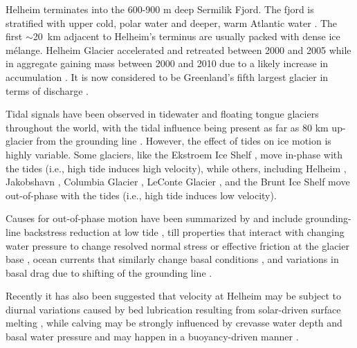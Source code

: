 \documentclass[review]{igs}
\begin{document}
	
Helheim terminates into the 600-900 m deep Sermilik Fjord. The fjord is stratified with upper cold, polar water and deeper, warm Atlantic water \citep{andresen2012rapid,straneo2012characteristics,straneo2013challenges}. The first $\sim$20~km adjacent to Helheim's terminus are usually packed with dense ice m\'elange. Helheim Glacier accelerated and retreated between 2000 and 2005 \citep{howat2005rapid,rignot2006changes} while in aggregate gaining mass between 2000 and 2010 due to a likely increase in accumulation \citep{howat2011mass}. It is now considered to be  Greenland's fifth largest glacier in terms of discharge \citep{enderlin2014improved}.
	
	
Tidal signals have been observed in tidewater and floating tongue glaciers throughout the world, with the tidal influence being present as far as 80 km up-glacier from the grounding line \citep{anandakrishnan2003ice}.  However, the effect of tides on ice motion is highly variable. Some glaciers, like the Ekstroem Ice Shelf \citep{heinert2007parametric}, move in-phase with the tides (i.e., high tide induces high velocity), while others, including Helheim \citep{de2010sudden}, Jakobshavn \citep{podrasky2014quantifying}, Columbia Glacier \citep{meier1987fast,walters1987analysis}, LeConte Glacier \citep{oneel2001leconte}, and the Brunt Ice Shelf \citep{doake2002tide} move out-of-phase with the tides (i.e., high tide induces low velocity). 


Causes for out-of-phase motion have been summarized by \citet{murray2007ice} and include grounding-line backstress reduction at low tide \citep{thomas2007tide}, till properties that interact with changing water pressure to change resolved normal stress or effective friction at the glacier base \citep{gudmundsson2005long}, ocean currents that similarly change basal conditions \citep{doake2002tide}, and variations in basal drag due to shifting of the grounding line \citep{heinert2007parametric,sayag2013elastic}.

Recently it has also been suggested that velocity at Helheim may be subject to diurnal variations caused by bed lubrication resulting from solar-driven surface melting \citep{davis2014tides}, while calving may be strongly influenced by crevasse water depth and basal water pressure \citep{cook2014modelling} and may happen in  a buoyancy-driven manner \citep{james2014buoyant}.


	
\end{document}

